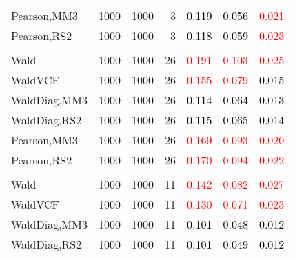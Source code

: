 \documentclass[
]{article}
\begin{document}
\begin{table}[H]
{\begin{tabular}[t]{lrrrrrr}
\hspace{1em}Pearson,MM3 & 1000 & 1000 & 3 & \textcolor{black}{0.119} & \textcolor{black}{0.056} & \textcolor{red}{0.021}\\
\hspace{1em}Pearson,RS2 & 1000 & 1000 & 3 & \textcolor{black}{0.118} & \textcolor{black}{0.059} & \textcolor{red}{0.023}\\
\addlinespace[0.3em]
\multicolumn{7}{l}{\textbf{1F 15V}}\\
\hspace{1em}Wald & 1000 & 1000 & 26 & \textcolor{red}{0.191} & \textcolor{red}{0.103} & \textcolor{red}{0.025}\\
\hspace{1em}WaldVCF & 1000 & 1000 & 26 & \textcolor{red}{0.155} & \textcolor{red}{0.079} & \textcolor{black}{0.015}\\
\hspace{1em}WaldDiag,MM3 & 1000 & 1000 & 26 & \textcolor{black}{0.114} & \textcolor{black}{0.064} & \textcolor{black}{0.013}\\
\hspace{1em}WaldDiag,RS2 & 1000 & 1000 & 26 & \textcolor{black}{0.115} & \textcolor{black}{0.065} & \textcolor{black}{0.014}\\
\hspace{1em}Pearson,MM3 & 1000 & 1000 & 26 & \textcolor{red}{0.169} & \textcolor{red}{0.093} & \textcolor{red}{0.020}\\
\hspace{1em}Pearson,RS2 & 1000 & 1000 & 26 & \textcolor{red}{0.170} & \textcolor{red}{0.094} & \textcolor{red}{0.022}\\
\addlinespace[0.3em]
\multicolumn{7}{l}{\textbf{2F 10V}}\\
\hspace{1em}Wald & 1000 & 1000 & 11 & \textcolor{red}{0.142} & \textcolor{red}{0.082} & \textcolor{red}{0.027}\\
\hspace{1em}WaldVCF & 1000 & 1000 & 11 & \textcolor{red}{0.130} & \textcolor{red}{0.071} & \textcolor{red}{0.023}\\
\hspace{1em}WaldDiag,MM3 & 1000 & 1000 & 11 & \textcolor{black}{0.101} & \textcolor{black}{0.048} & \textcolor{black}{0.012}\\
\hspace{1em}WaldDiag,RS2 & 1000 & 1000 & 11 & \textcolor{black}{0.101} & \textcolor{black}{0.049} & \textcolor{black}{0.012}\\

\end{tabular}}
\end{table}
\end{document}
